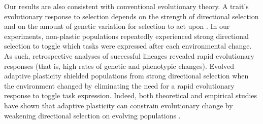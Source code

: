 
Our results are also consistent with conventional evolutionary theory.
A trait's evolutionary response to selection depends on the strength of directional selection and on the amount of genetic variation for selection to act upon \citep{lande_measurement_1983,zimmer_evolution_2013}.
In our experiments, non-plastic populations repeatedly experienced strong directional selection to toggle which tasks were expressed after each environmental change.
As such, retrospective analyses of successful lineages revealed rapid evolutionary responses (that is, high rates of genetic and phenotypic changes).
Evolved adaptive plasticity shielded populations from strong directional selection when the environment changed by eliminating the need for a rapid evolutionary response to toggle task expression.
Indeed, both theoretical and empirical studies have shown that adaptive plasticity can constrain evolutionary change by weakening directional selection on evolving populations \citep{price_role_2003,paenke_influence_2007,ghalambor_non-adaptive_2015}. 




